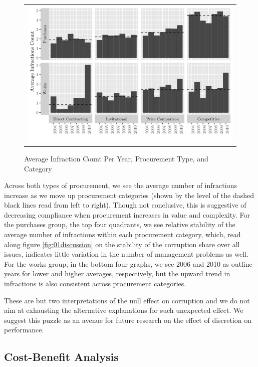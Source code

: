 \documentclass[11pt]{article}
\begin{document}
\begin{figure}[!htbp]
  \caption{Average Infraction Count Per Year, Procurement Type, and Category}
  \label{fig:02discussion}
  \centering
  \small
  \begin{tabular}{c}
  \includegraphics[scale = .2]{02discussionplot}
  \end{tabular}
\end{figure}

Across both types of procurement, we see the average number of infractions increase as we move up procurement categories (shown by the level of the dashed black lines read from left to right). Though not conclusive, this is suggestive of decreasing compliance when procurement increases in value and complexity. For the purchases group, the top four quadrants, we see relative stability of the average number of infractions within each procurement category, which, read along figure \ref{fig:01discussion} on the stability of the corruption share over all issues, indicates little variation in the number of management problems as well. For the works group, in the bottom four graphs, we see 2006 and 2010 as outline years for lower and higher averages, respectively, but the upward trend in infractions is also consistent across procurement categories.

These are but two interpretations of the null effect on corruption and we do not aim at exhausting the alternative explanations for such unexpected effect. We suggest this puzzle as an avenue for future research on the effect of discretion on performance.

\subsection{Cost-Benefit Analysis} \label{subsec:cba}
\end{document}
